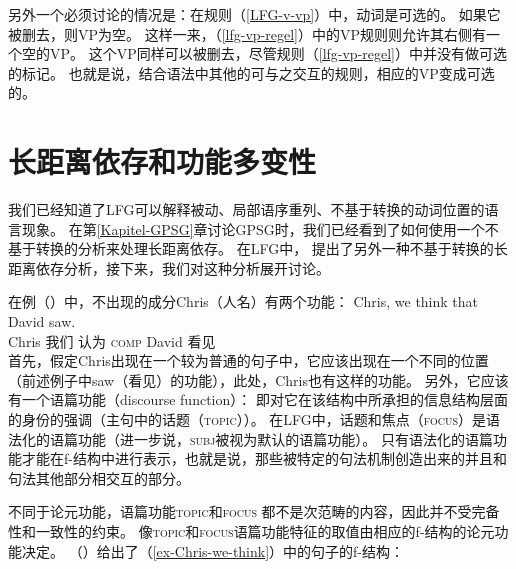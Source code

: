 另外一个必须讨论的情况是：在规则（\ref{LFG-v-vp}）中，动词是可选的。
如果它被删去，则VP为空。
这样一来，（\ref{lfg-vp-regel}）中的VP规则则允许其右侧有一个空的VP。
这个VP同样可以被删去，尽管规则（\ref{lfg-vp-regel}）中并没有做可选的标记。
也就是说，结合语法中其他的可与之交互的规则，相应的VP变成可选的。  

\section{长距离依存和功能多变性}
\label{Abschnitt-NLA-LFG}

我们已经知道了LFG可以解释被动、局部语序重列、不基于转换的动词位置的语言现象。
在第\ref{Kapitel-GPSG}章讨论GPSG时，我们已经看到了如何使用一个不基于转换的分析来处理长距离依存。
在LFG中， \citet{KZ89a}提出了另外一种不基于转换的长距离依存分析，接下来，我们对这种分析展开讨论。

在例（）中，不出现的成分Chris（人名）有两个功能：
\ea
\label{ex-Chris-we-think}
\gll Chris, we think that David saw.\\
Chris 我们 认为 \textsc{comp} David  看见\\
\z
首先，假定Chris出现在一个较为普通的句子中，它应该出现在一个不同的位置（前述例子中saw（看见）的\lfgobj 功能），此处，Chris也有这样的功能。
另外，它应该有一个语篇功能（discourse function）：
即对它在该结构中所承担的信息结构层面的身份的强调（主句中的话题（\textsc{topic}））。
在LFG中，话题和焦点（\textsc{focus}）是语法化的语篇功能（进一步说，\textsc{subj}被视为默认的语篇功能）。
只有语法化的语篇功能才能在f-结构中进行表示，也就是说，那些被特定的句法机制创造出来的并且和句法其他部分相交互的部分。

不同于论元功能，语篇功能\textsc{topic}和\textsc{focus}
都不是次范畴的内容，因此并不受完备性和一致性的约束。
像\textsc{topic}和\textsc{focus}语篇功能特征的取值由相应的f-结构的论元功能决定。
（）给出了（\ref{ex-Chris-we-think}）中的句子的f-结构：

\ea
{}
\z

